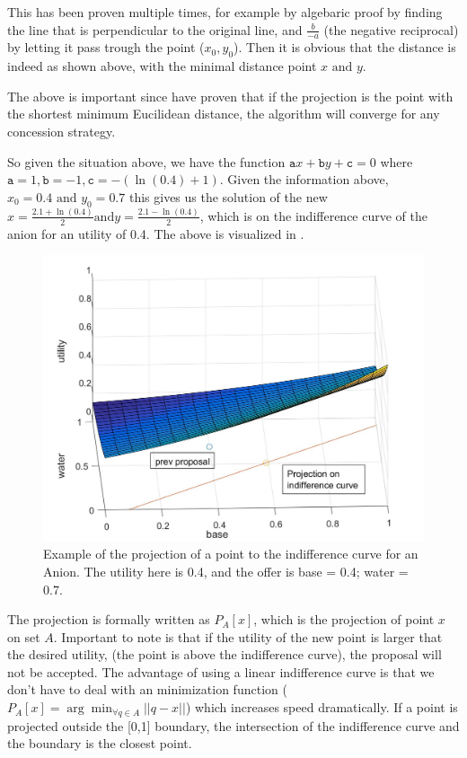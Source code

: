 This has been proven multiple times, for example by algebaric proof by finding the line that is perpendicular to the original line, and $\frac{b}{-a}$ (the negative reciprocal) by letting it pass trough the point ($x_0, y_0$). Then it is obvious that the distance is indeed as shown above, with the minimal distance point $x \text{ and }y$.

The above is important since \citet{zheng2015automated} have proven that if the projection is the point with the shortest minimum Eucilidean distance, the algorithm will converge for any concession strategy.

So given the situation above, we have the function $\texttt{a} x + \texttt{b} y + \texttt{c} = 0$ where $\texttt{a} = 1, \texttt{b} = -1, \texttt{c} = -(\ln(0.4)+1)$. Given the information above, $x_0 = 0.4 \text{ and } y_0 = 0.7$ this gives us the solution of the new $x=\frac{2.1 + \ln(0.4)}{2} \text{and} y = \frac{2.1 - \ln(0.4)}{2}$, which is on the indifference curve of the anion for an utility of 0.4.
The above is visualized in .

\begin{figure}[h]
	\centering
	\includegraphics[width=0.7\linewidth]{img/projection_anion_example}
	\caption{Example of the projection of a point to the indifference curve for an Anion. The utility here is 0.4, and the offer is base = 0.4; water = 0.7.}
	\label{fig:projectionanionexample}
\end{figure}

The projection is formally written as $P_A[x]$, which is the projection of point $x$ on set $A$. Important to note is that if the utility of the new point is larger that the desired utility, (the point is above the indifference curve), the proposal will not be accepted. The advantage of using a linear indifference curve is that we don't have to deal with an minimization function ($P_A[x] = \arg \displaystyle \min_{\forall q \in A} ||q-x||$) which increases speed dramatically. If a point is projected outside the [0,1] boundary, the intersection of the indifference curve and the boundary is the closest point.


